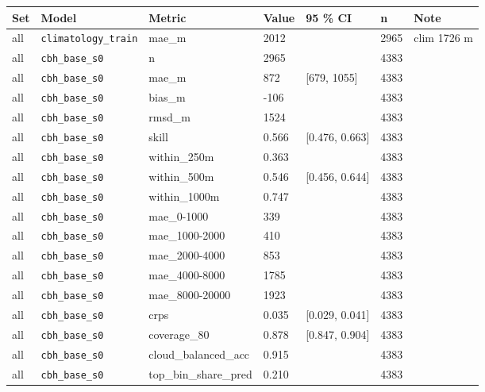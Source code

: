 \begin{center}{\scriptsize\setlength{\tabcolsep}{3pt}
\begin{tabular}{lp{2.4cm}llllp{7.3cm}}
\toprule
Set & Model & Metric & Value & 95 \% CI & n & Note \\
\midrule
all & \texttt{climatology\_\allowbreak{}train} & mae\_m & 2012 &  & 2965 & clim 1726 m \\
all & \texttt{cbh\_\allowbreak{}base\_\allowbreak{}s0} & n & 2965 &  & 4383 &  \\
all & \texttt{cbh\_\allowbreak{}base\_\allowbreak{}s0} & mae\_m & 872 & [679, 1055] & 4383 &  \\
all & \texttt{cbh\_\allowbreak{}base\_\allowbreak{}s0} & bias\_m & -106 &  & 4383 &  \\
all & \texttt{cbh\_\allowbreak{}base\_\allowbreak{}s0} & rmsd\_m & 1524 &  & 4383 &  \\
all & \texttt{cbh\_\allowbreak{}base\_\allowbreak{}s0} & skill & 0.566 & [0.476, 0.663] & 4383 &  \\
all & \texttt{cbh\_\allowbreak{}base\_\allowbreak{}s0} & within\_250m & 0.363 &  & 4383 &  \\
all & \texttt{cbh\_\allowbreak{}base\_\allowbreak{}s0} & within\_500m & 0.546 & [0.456, 0.644] & 4383 &  \\
all & \texttt{cbh\_\allowbreak{}base\_\allowbreak{}s0} & within\_1000m & 0.747 &  & 4383 &  \\
all & \texttt{cbh\_\allowbreak{}base\_\allowbreak{}s0} & mae\_0-1000 & 339 &  & 4383 &  \\
all & \texttt{cbh\_\allowbreak{}base\_\allowbreak{}s0} & mae\_1000-2000 & 410 &  & 4383 &  \\
all & \texttt{cbh\_\allowbreak{}base\_\allowbreak{}s0} & mae\_2000-4000 & 853 &  & 4383 &  \\
all & \texttt{cbh\_\allowbreak{}base\_\allowbreak{}s0} & mae\_4000-8000 & 1785 &  & 4383 &  \\
all & \texttt{cbh\_\allowbreak{}base\_\allowbreak{}s0} & mae\_8000-20000 & 1923 &  & 4383 &  \\
all & \texttt{cbh\_\allowbreak{}base\_\allowbreak{}s0} & crps & 0.035 & [0.029, 0.041] & 4383 &  \\
all & \texttt{cbh\_\allowbreak{}base\_\allowbreak{}s0} & coverage\_80 & 0.878 & [0.847, 0.904] & 4383 &  \\
all & \texttt{cbh\_\allowbreak{}base\_\allowbreak{}s0} & cloud\_balanced\_acc & 0.915 &  & 4383 &  \\
all & \texttt{cbh\_\allowbreak{}base\_\allowbreak{}s0} & top\_bin\_share\_pred & 0.210 &  & 4383 &  \\

\end{tabular}}
\end{center}
